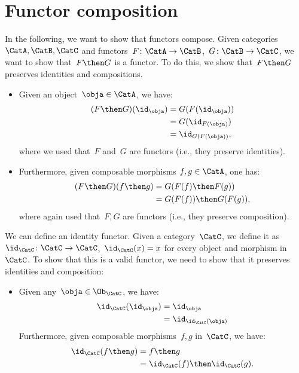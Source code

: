 

\section{Functor composition}


In the following, we want to show that functors compose.
Given categories~$\CatA,\CatB,\CatC$ and functors~$F\colon \CatA\to \CatB$,~$G\colon \CatB\to \CatC$, we want to show that~$F\then G$ is a functor. To do this, we show that~$F\then G$ preserves identities and compositions.
\begin{itemize}
  \item Given an object~$\obja\in \CatA$, we have:
  \begin{equation*}
    \begin{aligned}
    (F\then G)(\id_\obja)
      &=G(F(\id_\obja))\\
      &=G(\id_{F(\obja)})\\
      &=\id_{G(F(\obja))},
    \end{aligned}
  \end{equation*}
  where we used that~$F$ and~$G$ are functors (i.e., they preserve identities).
  \item Furthermore, given composable morphisms $f,g\in \CatA$, one has:
  \begin{equation*}
    \begin{aligned}
    (F\then G)(f\then g)
      &=G(F(f)\then F(g))\\
      &=G(F(f))\then G(F(g)),
    \end{aligned}
  \end{equation*}
  where again used that~$F,G$ are functors (i.e., they preserve composition).
\end{itemize}


We can define an identity functor. Given a category~$\CatC$, we define it as~$\id_\CatC\colon \CatC \to \CatC$,~$\id_\CatC(x)=x$ for every object and morphism in~$\CatC$. To show that this is a valid functor, we need to show that it preserves identities and composition:
\begin{itemize}
  \item Given any~$\obja \in \Ob_\CatC$, we have:
  \begin{equation*}
    \begin{aligned}
      \id_\CatC(\id_\obja)&=\id_\obja\\
      &=\id_{\id_\CatC(\obja)}
    \end{aligned}
  \end{equation*}
  Furthermore, given composable morphisms~$f,g$ in~$\CatC$, we have:
  \begin{equation*}
    \begin{aligned}
      \id_{\CatC}(f\then g)&=f\then g\\
      &=\id_{\CatC}(f)\then \id_{\CatC} (g).
    \end{aligned}
  \end{equation*}
\end{itemize}


